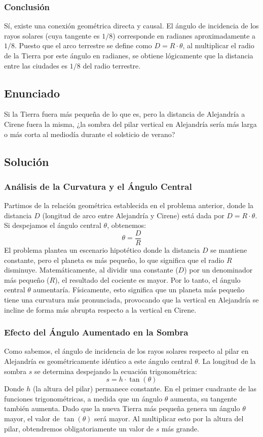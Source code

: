 \documentclass[12pt,letterpaper]{article}
\begin{document}
\subsubsection*{Conclusión}
Sí, existe una conexión geométrica directa y causal. El ángulo de incidencia de los rayos solares (cuya tangente es $1/8$) corresponde en radianes aproximadamente a $1/8$. Puesto que el arco terrestre se define como $D=R\cdot\theta$, al multiplicar el radio de la Tierra por este ángulo en radianes, se obtiene lógicamente que la distancia entre las ciudades es $1/8$ del radio terrestre.

\newpage

\subsection*{Enunciado}
Si la Tierra fuera más pequeña de lo que es, pero la distancia de Alejandría a Cirene fuera la misma, ¿la sombra del pilar vertical en Alejandría sería más larga o más corta al mediodía durante el solsticio de verano?

\subsection*{Solución}

\subsubsection*{Análisis de la Curvatura y el Ángulo Central}
Partimos de la relación geométrica establecida en el problema anterior, donde la distancia $D$ (longitud de arco entre Alejandría y Cirene) está dada por $D=R\cdot\theta$.
Si despejamos el ángulo central $\theta$, obtenemos:
$$\theta=\frac{D}{R}$$
El problema plantea un escenario hipotético donde la distancia $D$ se mantiene constante, pero el planeta es más pequeño, lo que significa que el radio $R$ disminuye. Matemáticamente, al dividir una constante ($D$) por un denominador más pequeño ($R$), el resultado del cociente es mayor. Por lo tanto, el ángulo central $\theta$ aumentaría.
Físicamente, esto significa que un planeta más pequeño tiene una curvatura más pronunciada, provocando que la vertical en Alejandría se incline de forma más abrupta respecto a la vertical en Cirene.

\subsubsection*{Efecto del Ángulo Aumentado en la Sombra}
Como sabemos, el ángulo de incidencia de los rayos solares respecto al pilar en Alejandría es geométricamente idéntico a este ángulo central $\theta$. 
La longitud de la sombra $s$ se determina despejando la ecuación trigonométrica:
$$s=h\cdot\tan(\theta)$$
Donde $h$ (la altura del pilar) permanece constante. En el primer cuadrante de las funciones trigonométricas, a medida que un ángulo $\theta$ aumenta, su tangente también aumenta. Dado que la nueva Tierra más pequeña genera un ángulo $\theta$ mayor, el valor de $\tan(\theta)$ será mayor. Al multiplicar esto por la altura del pilar, obtendremos obligatoriamente un valor de $s$ más grande.
\end{document}
